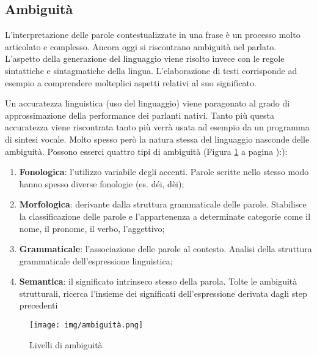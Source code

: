 \clearpage
\subsection{Ambiguità}
L’interpretazione delle parole contestualizzate in una frase è un processo molto articolato e complesso. Ancora oggi si riscontrano ambiguità nel parlato. L’aspetto della generazione del linguaggio viene risolto invece con le regole sintattiche e sintagmatiche della lingua. L’elaborazione di testi corrisponde ad esempio a comprendere molteplici aspetti relativi al suo significato.

Un accuratezza linguistica (uso del linguaggio) viene paragonato al grado di approssimazione della performance dei parlanti nativi. Tanto più questa accuratezza viene riscontrata tanto più verrà usata ad esempio da un programma di sintesi vocale.
Molto spesso però la natura stessa del linguaggio nasconde delle ambiguità. Possono esserci quattro tipi di ambiguità (Figura \ref{fig:ambiguità} a pagina \pageref{fig:ambiguità}):): 
\begin{enumerate}
    \item \textbf{Fonologica}: l’utilizzo variabile degli accenti. Parole scritte nello stesso modo hanno spesso diverse fonologie (es. déi, dèi);
    \item \textbf{Morfologica}: derivante dalla struttura grammaticale delle parole. Stabilisce la classificazione delle parole e l'appartenenza a determinate categorie come il nome, il pronome, il verbo, l'aggettivo;
    \item \textbf{Grammaticale}: l’associazione delle parole al contesto. Analisi della struttura grammaticale dell’espressione linguistica;
    \item \textbf{Semantica}: il significato intrinseco stesso della parola. Tolte le ambiguità strutturali, ricerca l’insieme dei significati dell’espressione derivata dagli step precedenti
\end{enumerate}

\begin{figure}[hbt!]
    \centering
    \texttt{[image: img/ambiguità.png]}
    \caption{Livelli di ambiguità}
    \label{fig:ambiguità}
\end{figure}